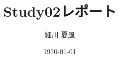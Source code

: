 \documentclass{jlreq}
\title{Study02レポート}
\author{細川 夏風}
\date{\today}
\begin{document}
  \maketitle

	\begin{thebibliography}{99}

	\end{thebibliography}
\end{document}
